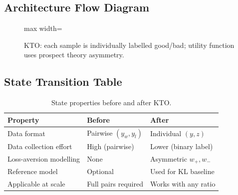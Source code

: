 \subsection{Architecture Flow Diagram}

\begin{figure}[h]
\centering
\begin{adjustbox}{max width=\linewidth}
\end{adjustbox}
\caption{KTO: each sample is individually labelled good/bad; utility function uses prospect theory asymmetry.}
\end{figure}

\subsection{State Transition Table}
\begin{table}[h]\centering
\begin{tabular}{lll}\toprule
\textbf{Property} & \textbf{Before} & \textbf{After}\\\midrule
Data format & Pairwise $(y_w, y_l)$ & Individual $(y, z)$\\
Data collection effort & High (pairwise) & Lower (binary label)\\
Loss-aversion modelling & None & Asymmetric $w_+, w_-$\\
Reference model & Optional & Used for KL baseline\\
Applicable at scale & Full pairs required & Works with any ratio\\\bottomrule
\end{tabular}
\caption{State properties before and after KTO.}
\end{table}


